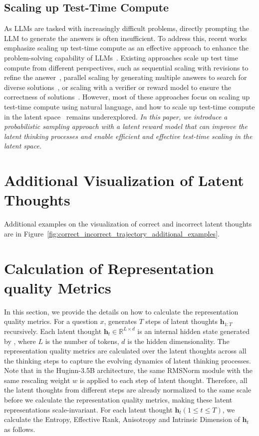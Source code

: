 \documentclass{article} %
\begin{document}
\subsection{Scaling up Test-Time Compute}
As LLMs are tasked with increasingly difficult problems, directly prompting the LLM to generate the answers is often insufficient. 
%
To address this, recent works emphasize scaling up test-time compute as an effective approach to enhance the problem-solving capability of LLMs~\citep{sardana2024beyond,snell2025scaling}.
%
Existing approaches scale up test time compute from different perspectives, such as sequential scaling with revisions to refine the answer~\citep{shinn2023reflexion,madaan2023self,muennighoff2025s1}, parallel scaling by generating multiple answers to search for diverse solutions~\citep{wang2023selfconsistency,yao2023tree,hao2023reasoning}, or scaling with a verifier or reward model to ensure the correctness of solutions~\citep{wang-etal-2024-math,lu2024autopsv,feng2025stepbystep,setlur2025scaling}. 
%
However, most of these approaches focus on scaling up test-time compute using natural language, and how to scale up test-time compute in the latent space~\citep{geiping2025scaling} remains underexplored. \emph{In this paper, we introduce a probabilistic sampling approach with a latent reward model that can improve the latent thinking processes and enable efficient and effective test-time scaling in the latent space.}
\section{Additional Visualization of Latent Thoughts}\label{appendix:examples_latent_thoughts}
Additional examples on the visualization of correct and incorrect latent thoughts are in Figure~\ref{fig:correct_incorrect_trajectory_additional_examples}.
\section{Calculation of Representation quality Metrics}\label{appendix:representation_quality_metrics}
In this section, we provide the details on how to calculate the representation quality metrics. For a question $x$, \LRLM generates $T$ steps of latent thoughts $\mathbf{h}_{1:T}$ recursively. Each latent thought $\mathbf{h}_t\in\mathbb{R}^{L\times d}$ is an internal hidden state generated by \LRLM, where $L$ is the number of tokens, $d$ is the hidden dimensionality. The representation quality metrics are calculated over the latent thoughts across all the thinking steps to capture the evolving dynamics of latent thinking processes. Note that in the Huginn-3.5B architecture, the same RMSNorm module with the same rescaling weight $w$ is applied to each step of latent thought. Therefore, all the latent thoughts from different steps are already normalized to the same scale before we calculate the representation quality metrics, making these latent representations scale-invariant. For each latent thought $\mathbf{h}_t (1{\leq}t{\leq}T)$, we calculate the Entropy, Effective Rank, Anisotropy and Intrinsic Dimension of $\mathbf{h}_t$ as follows.
\end{document}
